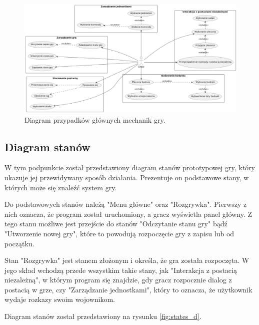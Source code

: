 \begin{figure}[!htbp]
    \centering
    \includegraphics[width=1.0\textwidth]{images/diagrams/usecase.jpg}
    \caption{Diagram przypadków głównych mechanik gry.}\label{fig:usecases_d}
\end{figure}
\FloatBarrier

\subsection{Diagram stanów}\label{ss:state}
W tym podpunkcie został przedstawiony diagram stanów prototypowej gry, który ukazuje jej przewidywany sposób działania.
Prezentuje on podstawowe stany, w których może się znaleźć system gry.

Do podstawowych stanów należą "Menu główne" oraz "Rozgrywka". Pierwszy z nich oznacza, że program został uruchomiony, a
gracz wyświetla panel główny. Z tego stanu możliwe jest przejście do stanów "Odczytanie stanu gry" bądź "Utworzenie
nowej gry", które to powodują rozpoczęcie gry z zapisu lub od początku.

Stan "Rozgrywka" jest stanem złożonym i określa, że gra została rozpoczęta. W jego skład wchodzą przede wszystkim takie
stany, jak "Interakcja z postacią niezależną", w którym program się znajdzie, gdy gracz rozpocznie dialog z postacią w grze,
czy "Zarządzanie jednostkami", który to oznacza, że użytkownik wydaje rozkazy swoim wojownikom.

Diagram stanów został przedstawiony na rysunku \ref{fig:states_d}.

